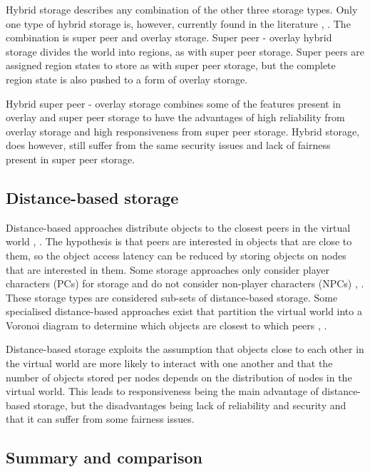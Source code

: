 \documentclass[10pt,a4paper,conference]{IEEEtran}
\begin{document}
Hybrid storage describes any combination of the other three storage types. Only one type of hybrid storage is, however, currently found in the
literature \cite{zoned_federation}, \cite{hybrid_storage1}. The combination is super peer and overlay storage. Super peer - overlay hybrid storage
divides the world into regions, as with super peer storage. Super peers are assigned region states to store as with super peer storage, but the
complete region state is also pushed to a form of overlay storage.

Hybrid super peer - overlay storage combines some of the features present in overlay and super peer storage to have the advantages of high
reliability from overlay storage and high responsiveness from super peer storage. Hybrid storage, does however, still suffer from the same security
issues and lack of fairness present in super peer storage.

\subsection{Distance-based storage}
\label{classic_distance_based}

Distance-based approaches distribute objects to the closest peers in the virtual world \cite{colyseus_distance_based}, \cite{solipsis}. The
hypothesis is that peers are interested in objects that are close to them, so the object access latency can be reduced by storing objects on nodes
that are interested in them. Some storage approaches only consider player characters (PCs) for storage and do not consider non-player characters
(NPCs) \cite{individual_storage1}, \cite{cheat_proof_playout}. These storage types are considered sub-sets of distance-based storage. Some
specialised distance-based approaches exist that partition the virtual world into a Voronoi diagram to determine which objects are closest to which
peers \cite{Buyukkaya_voronoi_state_management}, \cite{Hu_voronoi_IM}.

Distance-based storage exploits the assumption that objects close to each other in the virtual world are more likely to interact with one another and
that the number of objects stored per nodes depends on the distribution of nodes in the virtual world. This leads to responsiveness being the main
advantage of distance-based storage, but the disadvantages being lack of reliability and security and that it can suffer from some fairness issues.

\subsection{Summary and comparison}
\end{document}
